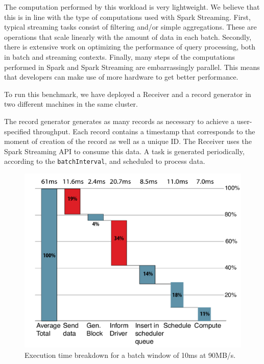 The computation performed by this workload is very lightweight.
We believe that this is in line with the type of computations used with Spark Streaming.
First, typical streaming tasks consist of filtering and/or simple aggregations.
These are operations that scale linearly with the amount of data in each batch.
Secondly, there is extensive work on optimizing the performance of query processing, both in batch and streaming contexts.
Finally, many steps of the computations performed in Spark and Spark Streaming are embarrassingly parallel. 
This means that developers can make use of more hardware to get better performance. 


To run this benchmark, we have deployed a Receiver and a record generator in two different machines in the same cluster.

The record generator generates as many records as necessary to achieve a user-specified throughput.
Each record contains a timestamp that corresponds to the moment of creation of the record as well as a unique ID.
The Receiver uses the Spark Streaming API to consume this data. 
A task is generated periodically, according to the  \texttt{batchInterval}, and scheduled to process data.

\begin{figure}[t!]
  \begin{center}
    \includegraphics[scale=0.40]{images_graphs/waterfall/Rplots_illustrator.pdf}
  \end{center}
  \caption{Execution time breakdown for a batch window of 10ms at 90MB/s.}
  \label{fig:SparkStreaming_time_breakdown}
\end{figure}

